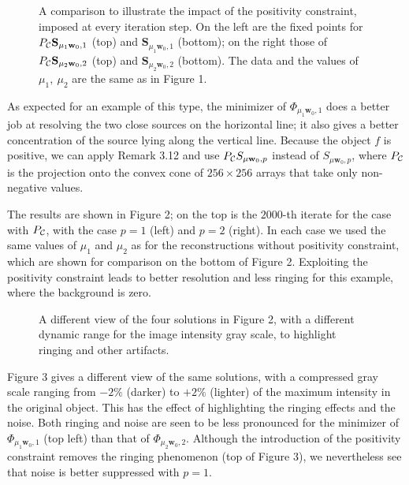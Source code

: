\documentclass[10pt]{article}
\begin{document}
\begin{figure}[h!tb]
\begin{center}
\caption{A comparison to illustrate the impact of the positivity constraint,
imposed at every iteration step. On the left are the fixed points for
$P_{\cal C} \mathbf{S}_{\mu_1 \mathbf{w}_0,1}$ (top) and
$\mathbf{S}_{\mu_1 \mathbf{w}_0,1}$ (bottom); on the right
those of $P_{\cal C} \mathbf{S}_{\mu_2 \mathbf{w}_0,2}$ (top) and
$\mathbf{S}_{\mu_2 \mathbf{w}_0,2}$ (bottom). The data
and the values of $\mu_1,~\mu_2$ are the same as in Figure 1.}
\end{center}
\end{figure}

As expected for an example of this type, the minimizer of
$\Phi_{\mu_1 \mathbf{w}_0,1}$ does a better job at
resolving the two close sources on the horizontal line; it also gives a better
concentration of the source lying along the vertical line.
Because the object $f$ is positive, we can
apply Remark 3.12  and use $P_{\cal C} S_{\mu \mathbf{w}_0,p}$ instead
of $S_{\mu \mathbf{w}_0,p}$, where $P_{\cal C}$ is the projection
onto the  convex cone of $256 \times 256$ arrays that take only non-negative
values.

The results are
shown in Figure 2; on the top is the $2000$-th iterate for the case with
$P_{\cal C}$,  with the case $p=1$
(left) and $p=2$ (right). In each case we used the same values of
$\mu_1$ and $\mu_2$ as for
the reconstructions without positivity constraint, which are shown for
comparison on the bottom of
Figure 2. Exploiting the positivity constraint leads to better resolution and
less ringing for this example, where the background is zero.

\begin{figure}[h!tb]
\begin{center}
\caption
{A different view of the four solutions in Figure 2, with a different
dynamic range for the image intensity gray scale, to highlight ringing
and other artifacts.}
\end{center}
\end{figure}

Figure 3 gives a different view of the same solutions, with
a compressed gray scale ranging from $- 2 \%$ (darker) to $+ 2 \%$ (lighter)
of the maximum intensity in the original object. This has the effect of
highlighting
the ringing effects and the noise. Both
ringing and noise are seen to be less pronounced for the minimizer of
$\Phi_{\mu_1 \mathbf{w}_0,1}$ (top left)
than that of $\Phi_{\mu_2 \mathbf{w}_0,2}$. Although the introduction of
the positivity constraint removes the
ringing phenomenon (top of Figure 3), we nevertheless see that noise is better
suppressed with $p=1$.
\end{document}

